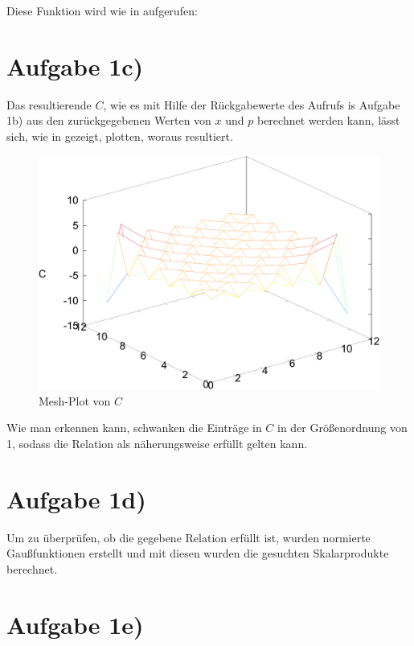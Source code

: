 Diese Funktion wird wie in  aufgerufen:


\section*{Aufgabe 1c)}
Das resultierende $C$, wie es mit Hilfe der Rückgabewerte des Aufrufs is Aufgabe 1b)
aus den zurückgegebenen Werten von $x$ und $p$ berechnet werden kann, lässt sich,
wie in  gezeigt, plotten, woraus  resultiert.



\begin{figure}[htb]
  \centering
  \includegraphics[width=0.8\columnwidth,keepaspectratio]{../tmp/mesh_c-crop}
  \caption{Mesh-Plot von $C$}
  \label{fig:mesh_c}
\end{figure}

Wie man erkennen kann, schwanken die Einträge in $C$ in der Größenordnung von 1, sodass
die Relation als näherungsweise erfüllt gelten kann.

\section*{Aufgabe 1d)}
Um zu überprüfen, ob die gegebene Relation erfüllt ist, wurden normierte Gaußfunktionen
erstellt und mit diesen wurden die gesuchten Skalarprodukte berechnet. 

\section*{Aufgabe 1e)}